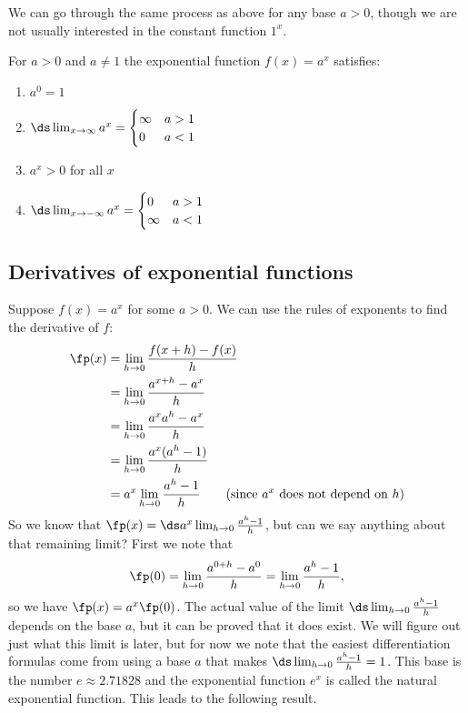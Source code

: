 We can go through the same process as above for any base $a>0$, though we are not usually interested in the constant function $1^x$.

\begin{keyidea}\label{ki_exp_func_props}
For $a>0$ and $a\neq1$ the exponential function $f(x)=a^x$ satisfies:
\begin{multicols}{2}
\begin{enumerate}
 \item $a^0=1$
 \item $\ds\lim_{x\to\infty}a^x=\begin{cases}\infty&a>1\\0&a<1\end{cases}$
 \item $a^x>0$ for all $x$
 \item $\ds\lim_{x\to-\infty}a^x=\begin{cases}0&a>1\\\infty&a<1\end{cases}$
\end{enumerate}
\end{multicols}
\end{keyidea}

\subsection{Derivatives of exponential functions}

Suppose $f(x)=a^x$ for some $a>0$. We can use the rules of exponents to find the derivative of $f$:
\begin{align*}
	\fp(x)
	&=\lim_{h\to 0}\frac{f(x+h)-f(x)}{h}\\
	&=\lim_{h\to 0}\frac{a^{x+h}-a^x}{h}\\
	&=\lim_{h\to 0}\frac{a^xa^h-a^x}{h}\\
	&=\lim_{h\to 0}\frac{a^x(a^h-1)}{h}\\
	&=a^x\lim_{h\to 0}\frac{a^h-1}{h} \qquad\text{(since $a^x$ does not depend on $h$)}\\
\end{align*}
So we know that $\fp(x)=\ds a^x \lim_{h\to 0}\frac{a^h-1}{h}$, but can we say anything about that remaining limit? First we note that
\[\fp(0)=\lim_{h\to 0}\frac  {a^{0+h}-a^0}{h}=\lim_{h\to 0}\frac{a^h-1}{h},\]
so we have $\fp(x)=a^x\fp(0)$. The actual value of the limit $\ds\lim_{h\to 0}\frac{a^h-1}{h}$ depends on the base $a$, but it can be proved that it does exist. We will figure out just what this limit is later, but for now we note that the easiest differentiation formulas come from using a base $a$ that makes $\ds\lim_{h\to 0}\frac{a^h-1}{h}=1$. This base is the
number $e\approx 2.71828$ and the exponential function $e^x$ is called the natural exponential function. This leads to the following result.

